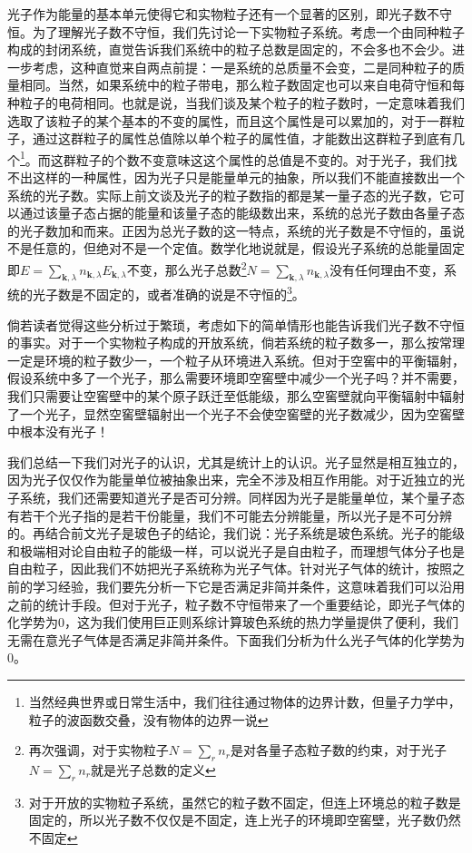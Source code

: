 \documentclass[../../main.tex]{subfiles}
\begin{document}
光子作为能量的基本单元使得它和实物粒子还有一个显著的区别，即光子数不守恒。为了理解光子数不守恒，我们先讨论一下实物粒子系统。考虑一个由同种粒子构成的封闭系统，直觉告诉我们系统中的粒子总数是固定的，不会多也不会少。进一步考虑，这种直觉来自两点前提：一是系统的总质量不会变，二是同种粒子的质量相同。当然，如果系统中的粒子带电，那么粒子数固定也可以来自电荷守恒和每种粒子的电荷相同。也就是说，当我们谈及某个粒子的粒子数时，一定意味着我们选取了该粒子的某个基本的不变的属性，而且这个属性是可以累加的，对于一群粒子，通过这群粒子的属性总值除以单个粒子的属性值，才能数出这群粒子到底有几个\footnote{当然经典世界或日常生活中，我们往往通过物体的边界计数，但量子力学中，粒子的波函数交叠，没有物体的边界一说}。而这群粒子的个数不变意味这这个属性的总值是不变的。对于光子，我们找不出这样的一种属性，因为光子只是能量单元的抽象，所以我们不能直接数出一个系统的光子数。实际上前文谈及光子的粒子数指的都是某一量子态的光子数，它可以通过该量子态占据的能量和该量子态的能级数出来，系统的总光子数由各量子态的光子数加和而来。正因为总光子数的这一特点，系统的光子数是不守恒的，虽说不是任意的，但绝对不是一个定值。数学化地说就是，假设光子系统的总能量固定即\(E=\sum_{\bm{k},\lambda}n_{\bm{k},\lambda}E_{\bm{k},\lambda}\)不变，那么光子总数\footnote{再次强调，对于实物粒子\(N=\sum_r n_r\)是对各量子态粒子数的约束，对于光子\(N=\sum_r n_r\)就是光子总数的定义}\(N=\sum_{\bm{k},\lambda}n_{\bm{k},\lambda}\)没有任何理由不变，系统的光子数是不固定的，或者准确的说是不守恒的\footnote{对于开放的实物粒子系统，虽然它的粒子数不固定，但连上环境总的粒子数是固定的，所以光子数不仅仅是不固定，连上光子的环境即空窖壁，光子数仍然不固定}。

倘若读者觉得这些分析过于繁琐，考虑如下的简单情形也能告诉我们光子数不守恒的事实。对于一个实物粒子构成的开放系统，倘若系统的粒子数多一，那么按常理一定是环境的粒子数少一，一个粒子从环境进入系统。但对于空窖中的平衡辐射，假设系统中多了一个光子，那么需要环境即空窖壁中减少一个光子吗？并不需要，我们只需要让空窖壁中的某个原子跃迁至低能级，那么空窖壁就向平衡辐射中辐射了一个光子，显然空窖壁辐射出一个光子不会使空窖壁的光子数减少，因为空窖壁中根本没有光子！

我们总结一下我们对光子的认识，尤其是统计上的认识。光子显然是相互独立的，因为光子仅仅作为能量单位被抽象出来，完全不涉及相互作用能。对于近独立的光子系统，我们还需要知道光子是否可分辨。同样因为光子是能量单位，某个量子态有若干个光子指的是若干份能量，我们不可能去分辨能量，所以光子是不可分辨的。再结合前文光子是玻色子的结论，我们说：光子系统是玻色系统。光子的能级和极端相对论自由粒子的能级一样，可以说光子是自由粒子，而理想气体分子也是自由粒子，因此我们不妨把光子系统称为光子气体。针对光子气体的统计，按照之前的学习经验，我们要先分析一下它是否满足非简并条件，这意味着我们可以沿用之前的统计手段。但对于光子，粒子数不守恒带来了一个重要结论，即光子气体的化学势为0，这为我们使用巨正则系综计算玻色系统的热力学量提供了便利，我们无需在意光子气体是否满足非简并条件。下面我们分析为什么光子气体的化学势为0。
\end{document}
